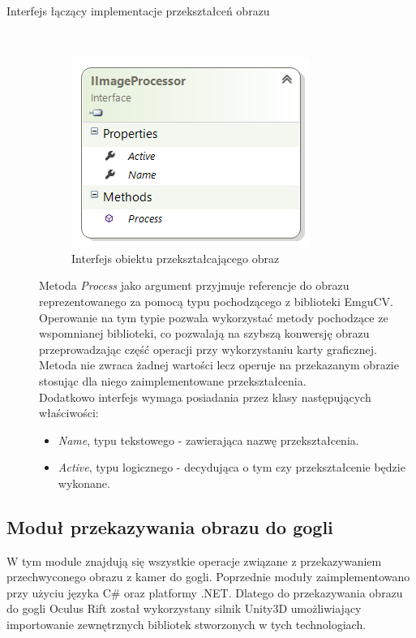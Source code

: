 \documentclass[a4paper,11pt,twoside]{report}
\theoremstyle{definition}
\begin{document}
\begin{description}
\item [Interfejs łączący implementacje przekształceń obrazu] \hfill \\

\begin{figure}[h]
\centering
\includegraphics[scale=0.9]{images/IImageProcessor}
\caption[Przekształcenie diagram diagram]{Interfejs obiektu przekształcającego obraz}
\end{figure}

Metoda \textit{Process} jako argument przyjmuje referencje do obrazu reprezentowanego za pomocą typu pochodzącego z biblioteki EmguCV. Operowanie na tym typie pozwala wykorzystać metody pochodzące ze wspomnianej biblioteki, co pozwalają na szybszą konwersję obrazu przeprowadzając część operacji przy wykorzystaniu karty graficznej. Metoda nie zwraca żadnej wartości lecz operuje na przekazanym obrazie stosując dla niego zaimplementowane przekształcenia.  \\
Dodatkowo interfejs wymaga posiadania przez klasy następujących właściwości:
\begin{itemize}
\item  \textit{Name}, typu tekstowego - zawierająca nazwę przekształcenia.
\item \textit{Active}, typu logicznego -  decydująca o tym czy przekształcenie będzie wykonane.
\end{itemize}

\end{description}

\subsection{Moduł przekazywania obrazu do gogli}

W tym module znajdują się wszystkie operacje związane z przekazywaniem przechwyconego obrazu z kamer do gogli. Poprzednie moduły zaimplementowano przy użyciu języka C\# oraz  platformy .NET. Dlatego do przekazywania obrazu do gogli Oculus Rift został wykorzystany silnik Unity3D umożliwiający importowanie zewnętrznych bibliotek stworzonych w tych technologiach.
\end{document}
